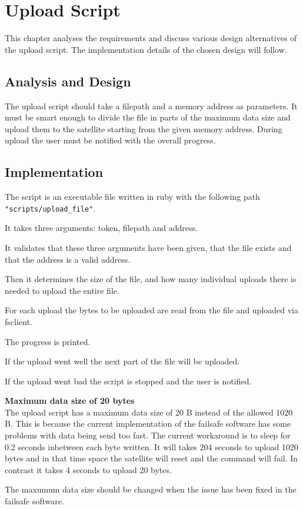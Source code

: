 \chapter{Upload Script}
\label{chap:upload_script}
This chapter analyses the requirements and discuss various design alternatives of the upload script. The implementation details of the chosen design will follow.

\section{Analysis and Design}
The upload script should take a filepath and a memory address as parameters. It must be smart enough to divide the file in parts of the maximum data size and upload them to the satellite starting from the given memory address.
During upload the user must be notified with the overall progress.

\section{Implementation}
The script is an executable file written in ruby with the following path \texttt{"scripts/upload\_file"}.

It takes three arguments: token, filepath and address.

It validates that these three arguments have been given, that the file exists and that the address is a valid address.

Then it determines the size of the file, and how many individual uploads there is needed to upload the entire file.

For each upload the bytes to be uploaded are read from the file and uploaded via fsclient.

The progress is printed.

If the upload went well the next part of the file will be uploaded.

If the upload went bad the script is stopped and the user is notified.

\textbf{Maximum data size of 20 bytes} \\
The upload script has a maximum data size of 20 B instead of the allowed 1020 B. This is because the current implementation of the failsafe software has some problems with data being send too fast. The current workaround is to sleep for 0.2 seconds inbetween each byte written. It will takes 204 seconds to upload 1020 bytes and in that time space the satellite will reset and the command will fail. In contrast it takes 4 seconds to upload 20 bytes.

The maxumum data size should be changed when the issue has been fixed in the failsafe software.
